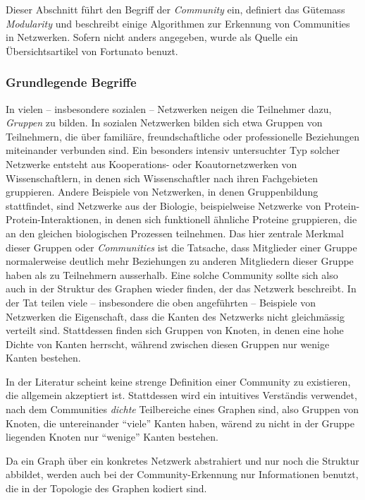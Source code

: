 Dieser Abschnitt f\"uhrt den Begriff der \emph{Community} ein,
definiert das G\"utemass \emph{Modularity} und beschreibt einige
Algorithmen zur Erkennung von Communities in Netzwerken. Sofern nicht
anders angegeben, wurde als Quelle ein \"Ubersichtsartikel von
Fortunato \cite{Fortunato2010} benuzt.

\subsubsection{Grundlegende Begriffe}
\label{sec:grundl-begr}

In vielen -- insbesondere sozialen -- Netzwerken neigen die Teilnehmer
dazu, \emph{Gruppen} zu bilden. In sozialen Netzwerken bilden sich
etwa Gruppen von Teilnehmern, die \"uber famili\"are,
freundschaftliche oder professionelle Beziehungen miteinander
verbunden sind. Ein besonders intensiv untersuchter Typ solcher
Netzwerke entsteht aus Kooperations- oder Koautornetzwerken von
Wissenschaftlern, in denen sich Wissenschaftler nach ihren
Fachgebieten gruppieren. Andere Beispiele von Netzwerken, in denen
Gruppenbildung stattfindet, sind Netzwerke aus der Biologie,
beispielweise Netzwerke von Protein-Protein-Interaktionen, in denen
sich funktionell \"ahnliche Proteine gruppieren, die an den gleichen
biologischen Prozessen teilnehmen. Das hier zentrale Merkmal dieser
Gruppen oder \emph{Communities} ist die Tatsache, dass Mitglieder
einer Gruppe normalerweise deutlich mehr Beziehungen zu anderen
Mitgliedern dieser Gruppe haben als zu Teilnehmern ausserhalb. Eine
solche Community sollte sich also auch in der Struktur des Graphen
wieder finden, der das Netzwerk beschreibt. In der Tat teilen viele --
insbesondere die oben angef\"uhrten -- Beispiele von Netzwerken die
Eigenschaft, dass die Kanten des Netzwerks nicht gleichm\"assig
verteilt sind. Stattdessen finden sich Gruppen von Knoten, in denen
eine hohe Dichte von Kanten herrscht, w\"ahrend zwischen diesen
Gruppen nur wenige Kanten bestehen.

In der Literatur scheint keine strenge Definition einer Community zu
existieren, die allgemein akzeptiert ist. Stattdessen wird ein
intuitives Verst\"andis verwendet, nach dem Communities \emph{dichte}
Teilbereiche eines Graphen sind, also Gruppen von Knoten, die
untereinander ``viele'' Kanten haben, w\"arend zu nicht in der Gruppe
liegenden Knoten nur ``wenige'' Kanten bestehen.

Da ein Graph \"uber ein konkretes Netzwerk abstrahiert und nur noch
die Struktur abbildet, werden auch bei der Community-Erkennung nur
Informationen benutzt, die in der Topologie des Graphen kodiert sind. 

